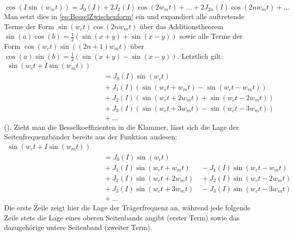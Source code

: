 \begin{equation}\label{eq:Besselcos}
\cos(I\sin(w_mt)) = J_0(I)+2J_2(I)\cos(2w_mt)+...+2J_{2n}(I)\cos(2nw_mt)+...
\end{equation}
Man setzt dies in \ref{eq:BesselZwischenform} ein und expandiert alle auftretende Terme der Form \begin{math} \sin(w_ct)\cos(2nw_mt) \end{math} über das Additionstheorem \begin{math} \sin(a)\cos(b) = \frac{1}{2}\left(\sin(x+y)+\sin(x-y)\right) \end{math} sowie alle Terme der Form \begin{math} \cos(w_ct)\sin((2n+1)w_mt) \end{math} über  \begin{math} \cos(a)\sin(b) = \frac{1}{2}\left(\sin(x+y)-\sin(x-y)\right) \end{math}. Letztlich gilt: 
\begin{equation}
\begin{split}
\sin(w_ct + I\sin(w_mt)) \\ &\quad = J_0(I)\sin(w_ct) \\ &\quad + J_1(I)(\sin(w_ct + w_mt) - \sin(w_ct - w_mt)) \\ &\quad + J_2(I)(\sin(w_ct + 2w_mt)+\sin(w_ct-2w_mt)) \\ &\quad  + J_3(I)(\sin(w_ct + 3w_mt) - \sin(w_ct - 3w_mt)) \\ &\quad  + ...
\end{split}
\end{equation}
(\cite[S.528]{chowningPaper}). Zieht man die Besselkoeffizienten in die Klammer, lässt sich die Lage der Seitenfrequenzbänder bereits aus der Funktion auslesen:
\begin{equation}\label{eq:FormelinchenBessel}
\begin{split}
\sin(w_ct + I\sin(w_mt)) \\ &\quad = J_0(I)\sin(w_ct) \\ &\quad + J_1(I)\sin(w_ct + w_mt) \quad\enspace - J_1(I)\sin(w_ct - w_mt) \\ &\quad + J_2(I)\sin(w_ct + 2w_mt) \quad + J_2(I)\sin(w_ct-2w_mt) \\ &\quad  + J_3(I)\sin(w_ct + 3w_mt) \quad - J_3(I)\sin(w_ct - 3w_mt) \\ &\quad  + ...
\end{split}
\end{equation}
Die erste Zeile zeigt hier die Lage der Trägerfrequenz an, während jede folgende Zeile stets die Lage eines oberen Seitenbands angibt (erster Term) sowie das dazugehörige untere Seitenband (zweiter Term). \\ 
